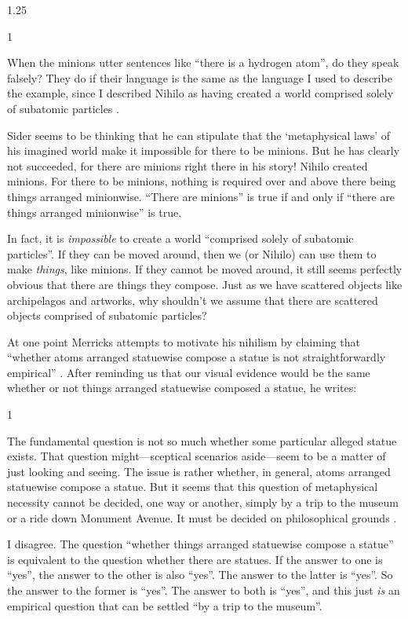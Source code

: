\documentclass[11pt]{article}
\newenvironment{squote}{%
\begin{spacing}{1}
       	\begin{list}{}{%
\setlength{\labelwidth}{0pt}%
\rightmargin\leftmargin%
}
\item\relax
}{%
\end{list}%
\end{spacing}
}
\begin{document}
\begin{spacing}{1.25}
\begin{squote}
When the minions utter sentences like ``there is a hydrogen atom'', do
they speak falsely?  They do if their language is the same as the
language I used to describe the example, since I described Nihilo as
having created a world comprised solely of subatomic particles
\citeyearpar[7]{sider2011c}.
\end{squote}

Sider seems to be thinking that he can stipulate that the
`metaphysical laws' of his imagined world make it impossible for there
to be minions.  But he has clearly not succeeded, for there are
minions right there in his story!  Nihilo created minions.  For there
to be minions, nothing is required over and above there being things
arranged minionwise.  ``There are minions'' is true if and only if
``there are things arranged minionwise'' is true.

In fact, it is {\em impossible} to create a world ``comprised solely
of subatomic particles''.  If they can be moved around, then we (or
Nihilo) can use them to make {\em things}, like minions.  If they
cannot be moved around, it still seems perfectly obvious that there
are things they compose.  Just as we have scattered objects like
archipelagos and artworks, why shouldn't we assume that there are
scattered objects comprised of subatomic particles?

At one point Merricks attempts to motivate his nihilism by claiming
that ``whether atoms arranged statuewise compose a statue is not
straightforwardly empirical'' \citeyearpar[9]{merricks2001a}.  After
reminding us that our visual evidence would be the same whether or not
things arranged statuewise composed a statue, he writes:

\begin{squote}
The fundamental question is not so much whether some particular
alleged statue exists.  That question might---sceptical scenarios
aside---seem to be a matter of just looking and seeing.  The issue is
rather whether, in general, atoms arranged statuewise compose a
statue.  But it seems that this question of metaphysical necessity
cannot be decided, one way or another, simply by a trip to the museum
or a ride down Monument Avenue.  It must be decided on philosophical
grounds \citeyearpar[9]{merricks2001a}.
\end{squote}

I disagree.  The question ``whether things arranged statuewise compose
a statue'' is equivalent to the question whether there are statues.
If the answer to one is ``yes'', the answer to the other is also
``yes''.  The answer to the latter is ``yes''.  So the answer to the
former is ``yes''.  The answer to both is ``yes'', and this just {\em
  is} an empirical question that can be settled ``by a trip to the
museum''.


\end{spacing}
\end{document}
